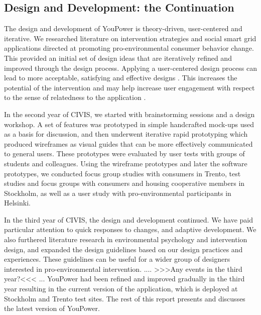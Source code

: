 %
%
%

\subsection{Design and Development: the Continuation}

The design and development of YouPower is theory-driven, user-centered and iterative. We researched literature on intervention strategies and social smart grid applications directed at promoting pro-environmental consumer behavior change. This provided an initial set of design ideas that are iteratively refined and improved through the design process. Applying a user-centered design process can lead to more acceptable, satisfying and effective designs \citep{Brynjarsdottir2012}. This increases the potential of the intervention \citep{dick2012empowering} and may help increase user engagement with respect to the sense of relatedness to the application \citep{pierce2003state,schwartz2014people,edward2015review}. 

In the second year of CIVIS, we started with brainstorming sessions and a design workshop. A set of features was prototyped in simple handcrafted mock-ups used as a basis for discussion, and then underwent iterative rapid prototyping which produced wireframes as visual guides that can be more effectively communicated to general users. These prototypes were evaluated by user tests with groups of students and colleagues. Using the wireframe prototypes and later the software prototypes, we conducted focus group studies with consumers in Trento, test studies and focus groups with consumers and housing cooperative members in Stockholm, as well as a user study with pro-environmental participants in Helsinki. 

In the third year of CIVIS, the design and development continued. We have paid particular attention to quick responses to changes, and adaptive development. We also furthered literature research in environmental psychology and intervention design, and expanded the design guidelines based on our design practices and experiences. These guidelines can be useful for a wider group of designers interested in pro-environmental intervention.   .... >>>Any events in the third year?<<< ...   YouPower had been refined and improved gradually in the third year resulting in the current version of the application, which is deployed at Stockholm and Trento test sites. The rest of this report presents and discusses the latest version of YouPower. 

 
